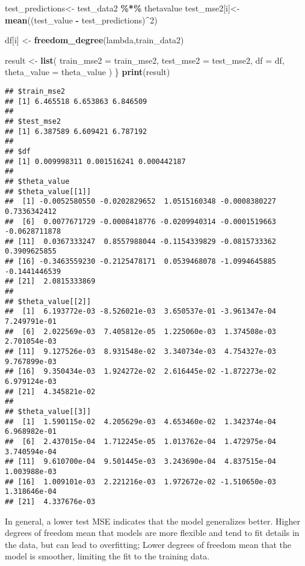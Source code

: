 \documentclass[
]{article}
\newenvironment{Shaded}{\begin{snugshade}}{\end{snugshade}}
\newcommand{\AttributeTok}[1]{\textcolor[rgb]{0.13,0.29,0.53}{#1}}
\newcommand{\DecValTok}[1]{\textcolor[rgb]{0.00,0.00,0.81}{#1}}
\newcommand{\FunctionTok}[1]{\textcolor[rgb]{0.13,0.29,0.53}{\textbf{#1}}}
\newcommand{\NormalTok}[1]{#1}
\newcommand{\OtherTok}[1]{\textcolor[rgb]{0.56,0.35,0.01}{#1}}
\newcommand{\SpecialCharTok}[1]{\textcolor[rgb]{0.81,0.36,0.00}{\textbf{#1}}}
\begin{document}
\begin{Shaded}
\begin{Highlighting}[]
\NormalTok{  test\_predictions}\OtherTok{\textless{}{-}}\NormalTok{ test\_data2 }\SpecialCharTok{\%*\%}\NormalTok{ thetavalue}
\NormalTok{  test\_mse2[i]}\OtherTok{\textless{}{-}} \FunctionTok{mean}\NormalTok{((test\_value }\SpecialCharTok{{-}}\NormalTok{ test\_predictions)}\SpecialCharTok{\^{}}\DecValTok{2}\NormalTok{)}
  
\NormalTok{  df[i] }\OtherTok{\textless{}{-}} \FunctionTok{freedom\_degree}\NormalTok{(lambda,train\_data2)}
  
\NormalTok{  result }\OtherTok{\textless{}{-}} \FunctionTok{list}\NormalTok{(}
    \AttributeTok{train\_mse2 =}\NormalTok{ train\_mse2,}
    \AttributeTok{test\_mse2 =}\NormalTok{ test\_mse2,}
    \AttributeTok{df =}\NormalTok{ df,}
    \AttributeTok{theta\_value =}\NormalTok{ theta\_value}
\NormalTok{  )}
\NormalTok{\}}
\FunctionTok{print}\NormalTok{(result)}
\end{Highlighting}
\end{Shaded}

\begin{verbatim}
## $train_mse2
## [1] 6.465518 6.653863 6.846509
## 
## $test_mse2
## [1] 6.387589 6.609421 6.787192
## 
## $df
## [1] 0.009998311 0.001516241 0.000442187
## 
## $theta_value
## $theta_value[[1]]
##  [1] -0.0052580550 -0.0202829652  1.0515160348 -0.0008380227  0.7336342412
##  [6]  0.0077671729 -0.0008418776 -0.0209940314 -0.0001519663 -0.0628711878
## [11]  0.0367333247  0.8557988044 -0.1154339829 -0.0815733362  0.3909625855
## [16] -0.3463559230 -0.2125478171  0.0539468078 -1.0994645885 -0.1441446539
## [21]  2.0815333869
## 
## $theta_value[[2]]
##  [1]  6.193772e-03 -8.526021e-03  3.650537e-01 -3.961347e-04  7.249791e-01
##  [6]  2.022569e-03  7.405812e-05  1.225060e-03  1.374508e-03  2.701054e-03
## [11]  9.127526e-03  8.931548e-02  3.340734e-03  4.754327e-03  9.767899e-03
## [16]  9.350434e-03  1.924272e-02  2.616445e-02 -1.872273e-02  6.979124e-03
## [21]  4.345821e-02
## 
## $theta_value[[3]]
##  [1]  1.590115e-02  4.205629e-03  4.653460e-02  1.342374e-04  6.968982e-01
##  [6]  2.437015e-04  1.712245e-05  1.013762e-04  1.472975e-04  3.740594e-04
## [11]  9.610700e-04  9.501445e-03  3.243690e-04  4.837515e-04  1.003988e-03
## [16]  1.009101e-03  2.221216e-03  1.972672e-02 -1.510650e-03  1.318646e-04
## [21]  4.337676e-03
\end{verbatim}

In general, a lower test MSE indicates that the model generalizes
better. Higher degrees of freedom mean that models are more flexible and
tend to fit details in the data, but can lead to overfitting; Lower
degrees of freedom mean that the model is smoother, limiting the fit to
the training data.
\end{document}
